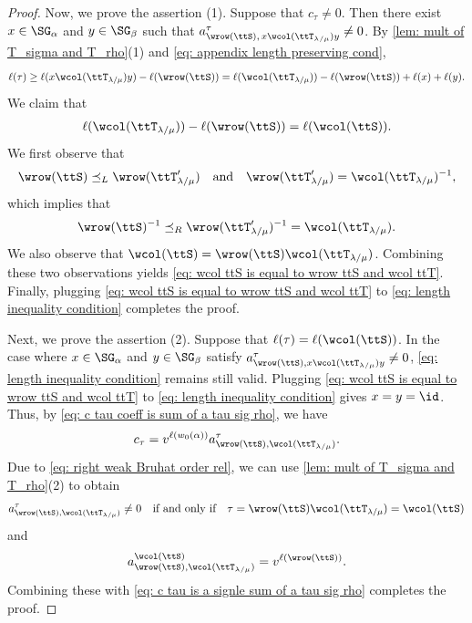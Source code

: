 \documentclass[12pt, reqno]{amsart}
\theoremstyle{plain}
\theoremstyle{definition}
\numberwithin{equation}{section}
\numberwithin{figure}{section}
\numberwithin{table}{section}
\begin{document}
\begin{proof}
Now, we prove the assertion (1). 
 Suppose that $c_\tau\neq0$. Then there exist $x\in\SG_\alpha$ and $y\in\SG_\beta$ such that 
$a^\tau_{\wrow(\ttS),\,x\wcol(\ttT_{\lambda/\mu})y} \neq 0$.
By 
\cref{lem: mult of T_sigma and T_rho}(1) and \cref{eq: appendix length preserving cond}, 
\begin{align}\label{eq: length inequality condition}
\ell(\tau) \geq \ell(x \wcol(\ttT_{\lambda/\mu}) y) - \ell(\wrow(\ttS)) = \ell(\wcol(\ttT_{\lambda/\mu})) - \ell(\wrow(\ttS)) + \ell(x) + \ell(y).
\end{align}
We claim that 
\begin{align}\label{eq: wcol ttS is equal to wrow ttS and wcol ttT}
\ell(\wcol(\ttT_{\lambda/\mu})) - \ell(\wrow(\ttS)) = 
\ell(\wcol(\ttS)).
\end{align}
We first observe that
\[
\wrow(\ttS) \preceq_L \wrow(\ttT'_{\lambda/\mu})\quad\text{and}\quad  \wrow(\ttT'_{\lambda/\mu}) = \wcol(\ttT_{\lambda/\mu})^{-1},
\]
which implies that
\begin{align}\label{eq: right weak Bruhat order rel}
\wrow(\ttS)^{-1} \preceq_R \wrow(\ttT'_{\lambda/\mu})^{-1} = \wcol(\ttT_{\lambda/\mu}).
\end{align}
We also observe that 
$\wcol(\ttS)
=
\wrow(\ttS)\wcol(\ttT_{\lambda/\mu})$.
Combining these two observations yields \cref{eq: wcol ttS is equal to wrow ttS and wcol ttT}.
Finally,  plugging \cref{eq: wcol ttS is equal to wrow ttS and wcol ttT} to \cref{eq: length inequality condition} 
completes the proof.








Next, we prove the assertion (2).
Suppose that $\ell(\tau) = \ell(\wcol(\ttS))$.
In the case where  $x\in\SG_\alpha$ and $y\in\SG_\beta$ satisfy $a^{\tau}_{\wrow(\ttS), x\wcol(\ttT_{\lambda/\mu})y} \neq 0$, 
\cref{eq: length inequality condition}  remains still valid.
Plugging 
\cref{eq: wcol ttS is equal to wrow ttS and wcol ttT} to \cref{eq: length inequality condition} gives $x = y = \id$.
Thus, by \cref{eq: c tau coeff is sum of a tau sig rho}, we have
\begin{align}\label{eq: c tau is a signle sum of a tau sig rho}
c_\tau = v^{\ell(w_0(\alpha))} a^{\tau}_{\wrow(\ttS), \wcol(\ttT_{\lambda/\mu})}.
\end{align}
Due to \cref{eq: right weak Bruhat order rel},
we can use \cref{lem: mult of T_sigma and T_rho}(2) to obtain
\[
a^{\tau}_{\wrow(\ttS), \wcol(\ttT_{\lambda/\mu})} \neq 0\quad\text{if and only if}\quad \tau = \wrow(\ttS)\wcol(\ttT_{\lambda/\mu}) = \wcol(\ttS)
\]
and
\[ 
a^{\wcol(\ttS)}_{\wrow(\ttS), \wcol(\ttT_{\lambda/\mu})} = v^{\ell(\wrow(\ttS))}.
\]
Combining these with \cref{eq: c tau is a signle sum of a tau sig rho} completes the proof.
\end{proof}
\end{document}
